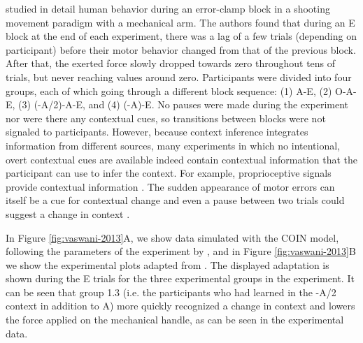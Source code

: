 \documentclass[a4paper,doc,floatsintext,natbib]{apa6}
\def \fref #1{Figure \ref{#1}}     %
\begin{document}
\cite{Vaswani_Decay_2013} studied in detail human behavior during an error-clamp block in a shooting movement paradigm with a mechanical arm. The authors found that during an E block at the end of each experiment, there was a lag of a few trials (depending on participant) before their motor behavior changed from that of the previous block. After that, the exerted force slowly dropped towards zero throughout tens of trials, but never reaching values around zero. Participants were divided into four groups, each of which going through a different block sequence: (1) A-E, (2) O-A-E, (3) (-A/2)-A-E, and (4) (-A)-E. No pauses were made during the experiment nor were there any contextual cues, so transitions between blocks were not signaled to participants. However, because context inference integrates information from different sources, many experiments in which no intentional, overt contextual cues are available indeed contain contextual information that the participant can use to infer the context. For example, proprioceptive signals  provide contextual information \citep{Dizio_Motor_1995,Shadmehr_Adaptive_1994}. The sudden appearance of motor errors can itself be a cue for contextual change \citep{Herzfeld_memory_2014} and even a pause between two trials could suggest a change in context \citep{Ethier_Spontaneous_2008}.

In \fref{fig:vaswani-2013}A, we show data simulated with the COIN model, following the parameters of the experiment by \cite{Vaswani_Decay_2013}, and in \fref{fig:vaswani-2013}B we show the experimental plots adapted from \cite{Vaswani_Decay_2013}. The displayed adaptation is shown during the E trials for the three experimental groups in the experiment. It can be seen that group 1.3 (i.e. the participants who had learned in the -A/2 context in addition to A) more quickly recognized a change in context and lowers the force applied on the mechanical handle, as can be seen in the experimental data.
\end{document}
